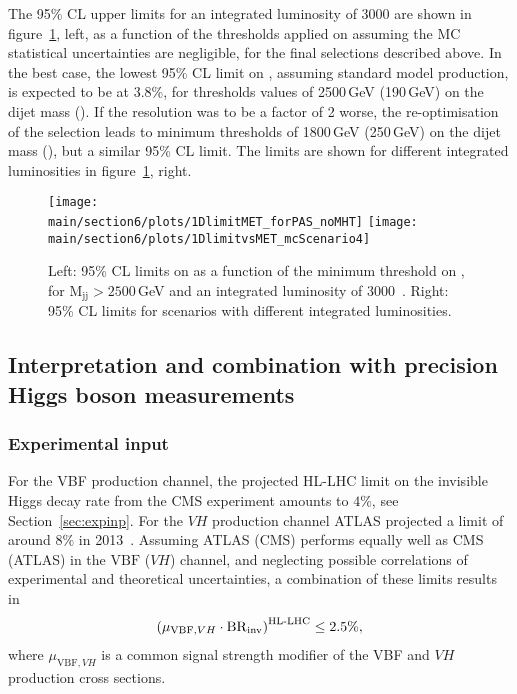 \documentclass[../report.tex]{subfiles}
\providecommand{\main}{..}
\begin{document}
The 95\% CL upper limits for an integrated luminosity of 3000\fbinv
are shown in figure~\ref{fig:1Dlimits}, left, as a function of the
thresholds applied on \MET assuming the MC statistical uncertainties
are negligible, for the final selections described above. In the best
case, the lowest 95\% CL limit on \BHinv, assuming standard model
production, is expected to be at 3.8\%, for thresholds values of
2500\,GeV (190\,GeV) on the dijet mass (\MET). If the \MET resolution
was to be a factor of 2 worse, the re-optimisation of the selection
leads to minimum thresholds of 1800\,GeV (250\,GeV) on the dijet mass
(\MET), but a similar 95\% CL limit. The limits are shown for
different integrated luminosities in figure~\ref{fig:1Dlimits}, right.


\begin{figure}[htbp]
  \centering
    \texttt{[image: \\main/section6/plots/1DlimitMET\_forPAS\_noMHT]}
    \hfill
    \texttt{[image: \\main/section6/plots/1DlimitvsMET\_mcScenario4]}
\caption{Left: 95\% CL limits on \BHinv as a function of the minimum threshold on \MET, for M$_{\text{jj}}>2500$\,GeV and an integrated luminosity of 3000\fbinv ~\cite{CMS-PAS-FTR-18-016}. Right: 95\% CL limits for scenarios with different integrated luminosities.}
  \label{fig:1Dlimits}
\end{figure}


\subsection{Interpretation and combination with precision Higgs boson measurements}
\subsubsection{Experimental input}
\label{sec6:exp}
{For the VBF production channel, the projected HL-LHC limit on the invisible Higgs decay rate from the CMS experiment amounts to $4\%$, see Section~\ref{sec:expinp}. For the $VH$ production channel ATLAS projected a limit of around $8\%$ in 2013}~\cite{ATL-PHYS-PUB-2013-014}.
Assuming ATLAS (CMS) performs equally well as CMS (ATLAS) in the $\text{VBF}$ ($VH$) channel, and neglecting possible correlations of experimental and theoretical uncertainties, a combination of these limits results in
\begin{align}\label{eq:brinvcombi}
\left(\mu_{\text{VBF},VH} \cdot \BRHinv \right)^\text{HL-LHC} \le 2.5\%,
\end{align}
where $\mu_{\text{VBF},VH}$ is a common signal strength modifier of the VBF and $VH$ production cross sections.
\end{document}
